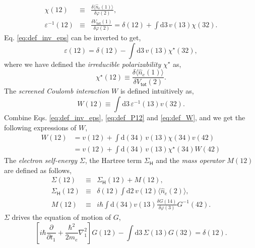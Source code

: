 \documentclass[11pt, oneside]{article}          %
\begin{document}
\begin{eqnarray}
  \label{eq:def_inv_chi}
  \chi(12) & \equiv & \frac{\delta \langle \hat{n}_e(1) \rangle}{\delta \varphi(2)}, \\
  \label{eq:def_inv_eps}
  \varepsilon^{-1}(12) & \equiv & \frac{\delta V_{\mathsf{tot}}(1)}{\delta \varphi(2)} = \delta(12) + \int \mathrm{d}3 \, v(13) \chi(32).
\end{eqnarray}
Eq. \eqref{eq:def_inv_eps} can be inverted to get,
\begin{equation}
  \label{eq:def_eps}
  \varepsilon(12) = \delta(12) - \int \mathrm{d}3 \, v(13) \chi^{\star}(32),
\end{equation}
where we have defined the \emph{irreducible polarizability} $\chi^{\star}$ as,
\begin{equation}
  \label{eq:def_P12}
  \chi^{\star}(12) \equiv \frac{\delta \langle \hat{n}_e(1) \rangle}{\delta V_{\mathsf{tot}}(2)}.
\end{equation}
The \emph{screened Coulomb interaction} $W$ is defined intuitively as,
\begin{equation}
  \label{eq:def_W}
  W(12) \equiv \int \mathrm{d} 3 \, \varepsilon^{-1}(13) v(32).
\end{equation}
Combine Eqs. \eqref{eq:def_inv_eps}, \eqref{eq:def_P12} and \eqref{eq:def_W}, and we get the following expressions of $W$,
\begin{equation}
  \label{eq:W_v_chi}
  \begin{aligned}
    W(12) & = v(12) + \int \mathrm{d} (34) \, v(13) \chi(34) v(42) \\
    & = v(12) + \int \mathrm{d} (34) \, v(13) \chi^{\star}(34) W(42)
  \end{aligned}
\end{equation}
The \emph{electron self-energy} $\Sigma$, the Hartree term $\Sigma_{\mathsf{H}}$ and the \emph{mass operator} $M(12)$ are defined as follows,
\begin{eqnarray}
  \label{eq:def_Sigma}
  \Sigma(12) & \equiv & \Sigma_{\mathsf{H}}(12) + M(12), \\
  \label{eq:def_Sigma_H}
  \Sigma_{\mathsf{H}} (12) & \equiv & \delta(12) \int \mathrm{d}2 \, v(12) \langle \hat{n}_e(2) \rangle, \\
  \label{eq:def_M}
  M(12) & \equiv & i \hbar \int \mathrm{d}(34) v(13) \frac{\delta G(14)}{\delta \varphi(3)} G^{-1}(42).
\end{eqnarray}
$\Sigma$ drives the equation of motion of $G$,
\begin{equation}
  \label{eq:EOM_of_GF_2}
  \left [ i \hbar \frac{\partial}{\partial t_1} + \frac{\hbar^2}{2m_e} \nabla^2_1 \right ] G(12) - \int \mathrm{d}3 \, \Sigma(13) G(32) = \delta(12).
\end{equation}
\end{document}
